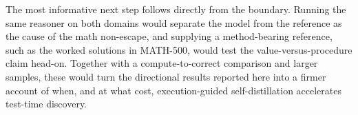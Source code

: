 The most informative next step follows directly from the boundary. Running the same reasoner on both domains would separate the model from the reference as the cause of the math non-escape, and supplying a method-bearing reference, such as the worked solutions in MATH-500, would test the value-versus-procedure claim head-on. Together with a compute-to-correct comparison and larger samples, these would turn the directional results reported here into a firmer account of when, and at what cost, execution-guided self-distillation accelerates test-time discovery.
